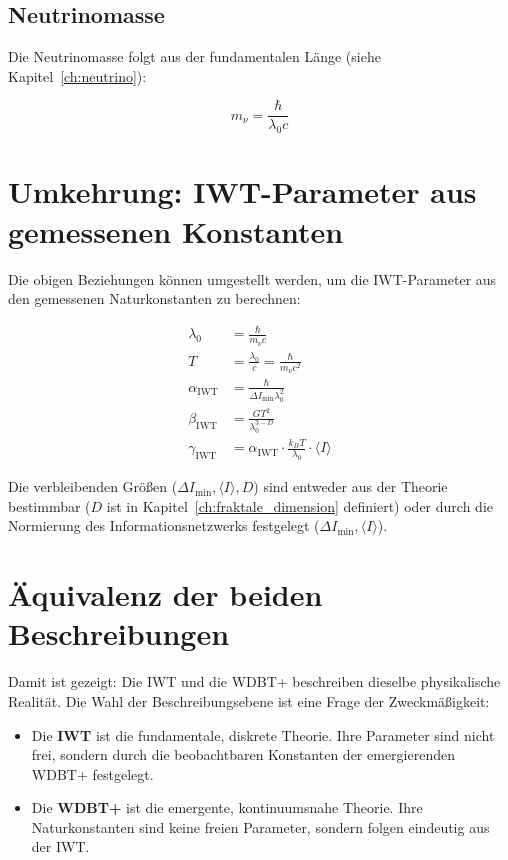 \subsection{Neutrinomasse}
\label{sub:nu_relation}

Die Neutrinomasse folgt aus der fundamentalen Länge (siehe Kapitel~\ref{ch:neutrino}):

\[
m_\nu = \frac{\hbar}{\lambda_0 c}
\]

\section{Umkehrung: IWT-Parameter aus gemessenen Konstanten}
\label{sec:umkehrung}

Die obigen Beziehungen können umgestellt werden, um die IWT-Parameter aus den gemessenen Naturkonstanten zu berechnen:

\[
\begin{aligned}
\lambda_0 &= \frac{\hbar}{m_\nu c} \\[4pt]
T &= \frac{\lambda_0}{c} = \frac{\hbar}{m_\nu c^2} \\[4pt]
\alpha_{\text{IWT}} &= \frac{\hbar}{\Delta I_{\min} \lambda_0^2} \\[4pt]
\beta_{\text{IWT}} &= \frac{G T^2}{\lambda_0^{3-D}} \\[4pt]
\gamma_{\text{IWT}} &= \alpha_{\text{IWT}} \cdot \frac{k_B T}{\lambda_0} \cdot \langle I \rangle
\end{aligned}
\]

Die verbleibenden Größen (\( \Delta I_{\min}, \langle I \rangle, D \)) sind entweder aus der Theorie bestimmbar (\( D \) ist in Kapitel~\ref{ch:fraktale_dimension} definiert) oder durch die Normierung des Informationsnetzwerks festgelegt (\( \Delta I_{\min}, \langle I \rangle \)).

\section{Äquivalenz der beiden Beschreibungen}
\label{sec:aequivalenz}

Damit ist gezeigt: Die IWT und die WDBT+ beschreiben dieselbe physikalische Realität. Die Wahl der Beschreibungsebene ist eine Frage der Zweckmäßigkeit:

\begin{itemize}
    \item Die \textbf{IWT} ist die fundamentale, diskrete Theorie. Ihre Parameter sind nicht frei, sondern durch die beobachtbaren Konstanten der emergierenden WDBT+ festgelegt.
    \item Die \textbf{WDBT+} ist die emergente, kontinuumsnahe Theorie. Ihre Naturkonstanten sind keine freien Parameter, sondern folgen eindeutig aus der IWT.
\end{itemize}

